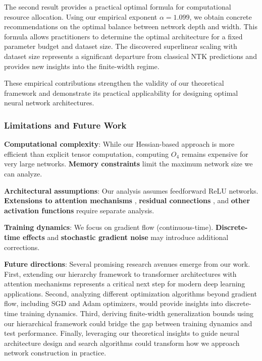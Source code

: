 \documentclass[a4paper]{article}
\theoremstyle{plain}
\theoremstyle{definition}
\theoremstyle{remark}
\begin{document}
The second result provides a practical optimal formula for computational resource allocation. Using our empirical exponent $\alpha = 1.099$, we obtain concrete recommendations on the optimal balance between network depth and width. This formula allows practitioners to determine the optimal architecture for a fixed parameter budget and dataset size. The discovered superlinear scaling with dataset size represents a significant departure from classical NTK predictions and provides new insights into the finite-width regime.

These empirical contributions strengthen the validity of our theoretical framework and demonstrate its practical applicability for designing optimal neural network architectures.








\subsubsection{Limitations and Future Work}

\begin{tcolorbox}[colback=red!10,colframe=red!60!black,title={\textbf{Current Limitations and Research Directions}},enhanced,drop shadow]

\textbf{Computational complexity}: While our Hessian-based approach is more efficient than explicit tensor computation, computing $O_4$ remains expensive for very large networks. \textbf{Memory constraints} limit the maximum network size we can analyze.

\textbf{Architectural assumptions}: Our analysis assumes feedforward ReLU networks. \textbf{Extensions to attention mechanisms} \cite{vaswani2017attention}, \textbf{residual connections} \cite{he2016deep}, and \textbf{other activation functions} require separate analysis.

\textbf{Training dynamics}: We focus on gradient flow (continuous-time). \textbf{Discrete-time effects} \cite{cohen2021gradient} and \textbf{stochastic gradient noise} \cite{mandt2017stochastic} may introduce additional corrections.

\textbf{Future directions}: Several promising research avenues emerge from our work. First, extending our hierarchy framework to transformer architectures with attention mechanisms represents a critical next step for modern deep learning applications. Second, analyzing different optimization algorithms beyond gradient flow, including SGD and Adam optimizers, would provide insights into discrete-time training dynamics. Third, deriving finite-width generalization bounds using our hierarchical framework could bridge the gap between training dynamics and test performance. Finally, leveraging our theoretical insights to guide neural architecture design and search algorithms could transform how we approach network construction in practice.
\end{tcolorbox}
\end{document}
